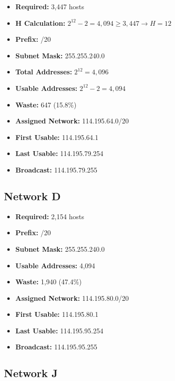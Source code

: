 \documentclass[12pt,a4paper]{report}
\begin{document}
\begin{itemize}
    \item \textbf{Required:} 3,447 hosts
    \item \textbf{H Calculation:} $2^{12} - 2 = 4,094 \geq 3,447 \rightarrow H = 12$
    \item \textbf{Prefix:} /20
    \item \textbf{Subnet Mask:} 255.255.240.0
    \item \textbf{Total Addresses:} $2^{12} = 4,096$
    \item \textbf{Usable Addresses:} $2^{12} - 2 = 4,094$
    \item \textbf{Waste:} 647 (15.8\%)
    \item \textbf{Assigned Network:} 114.195.64.0/20
    \item \textbf{First Usable:} 114.195.64.1
    \item \textbf{Last Usable:} 114.195.79.254
    \item \textbf{Broadcast:} 114.195.79.255
\end{itemize}

\subsection{Network D}

\begin{itemize}
    \item \textbf{Required:} 2,154 hosts
    \item \textbf{Prefix:} /20
    \item \textbf{Subnet Mask:} 255.255.240.0
    \item \textbf{Usable Addresses:} 4,094
    \item \textbf{Waste:} 1,940 (47.4\%)
    \item \textbf{Assigned Network:} 114.195.80.0/20
    \item \textbf{First Usable:} 114.195.80.1
    \item \textbf{Last Usable:} 114.195.95.254
    \item \textbf{Broadcast:} 114.195.95.255
\end{itemize}

\subsection{Network J}
\end{document}
